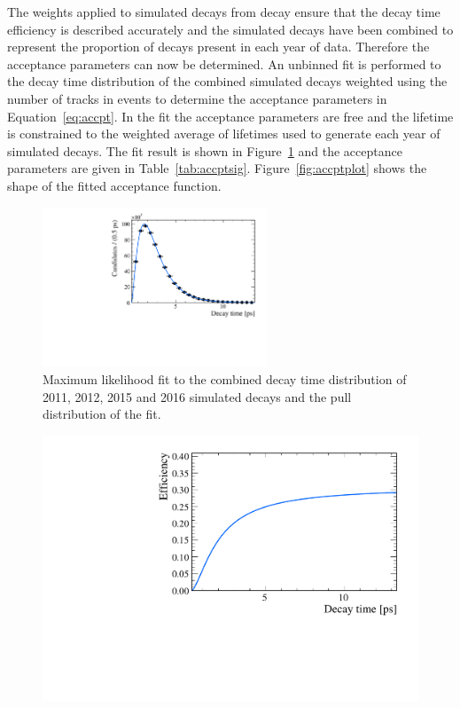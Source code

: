 {The weights applied to \bsmumu simulated decays from \bdkpi decay ensure that the decay time efficiency is described accurately and the simulated decays have been combined to represent the proportion of decays present in each year of data. Therefore the acceptance parameters can now be determined.  
An unbinned \ml fit is performed to the decay time distribution of the combined simulated \bsmumu decays weighted using the number of tracks in \bdkpi events to determine the acceptance parameters in Equation~\ref{eq:accpt}. In the fit the acceptance parameters are free and the \bsmumu lifetime is constrained to the weighted average of lifetimes used to generate each year of simulated decays. The fit result is shown in Figure~\ref{fig:accptfit} and the acceptance parameters are given in Table~\ref{tab:accptsig}. Figure~\ref{fig:accptplot} shows the shape of the fitted acceptance function. %




\begin{figure}[tbp]
    \centering
        \includegraphics[width= 0.6\textwidth]{./Figs/LifetimeMeasurement/Bs2MuMu_Acceptance_fit.pdf}
    \caption{Maximum likelihood fit to the combined decay time distribution of 2011, 2012, 2015 and 2016 simulated \bsmumu decays and the pull distribution of the fit. }
    \label{fig:accptfit}
\end{figure}


\begin{figure}[tbp]
    \centering
        \includegraphics[width= 0.6 \textwidth]{./Figs/LifetimeMeasurement/Bs2MuMu_Acceptance_plot_no_points.pdf}


\end{figure}}
